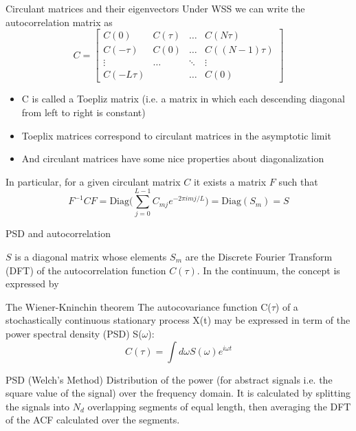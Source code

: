 \documentclass[
10pt,
aspectratio=169,
]{beamer}
\begin{document}
\begin{frame}{Circulant matrices and their eigenvectors}
Under WSS we can write the autocorrelation matrix as
    \[C=
\begin{bmatrix}
    C(0) & C(\tau) & \dots  & C(N\tau) \\
    C(-\tau) & C(0) & \dots  & C((N-1)\tau)\\
    \vdots & \dots & \ddots & \vdots \\
    C(-L\tau) & & \dots & C(0)
\end{bmatrix}
\]
\begin{itemize}
    \item C is called a Toepliz matrix (i.e. a matrix in which each descending diagonal from left to right is constant)
    \item Toeplix matrices correspond to circulant matrices in the asymptotic limit
    \item And circulant matrices have some nice properties about diagonalization
\end{itemize}
In particular, for a given circulant matrix $C$ it exists a matrix $F$ such that
\[
F^{-1}CF = \text{Diag}\biggl(\sum_{j=0}^{L-1}C_{mj}e^{-2\pi imj/L}\biggr) = \text{Diag}(S_m) = S
\]
\end{frame}
\begin{frame}{PSD and autocorrelation}

$S$ is a diagonal matrix whose elements $S_m$ are the Discrete Fourier Transform (DFT) of the autocorrelation function $C(\tau)$. 
In the continuum, the concept is expressed by 
\begin{block}{The Wiener-Kninchin theorem}
    The autocovariance function C($\tau$) of a stochastically continuous stationary process X(t) may be expressed in term of the power spectral density (PSD) S($\omega$):
    \begin{equation}
        C(\tau) = \int d\omega S(\omega) e^{i\omega t}
    \end{equation}
    
\end{block}
    \begin{block}{PSD (Welch's Method)}
        Distribution of the power (for abstract signals i.e. the square value of the signal) over the frequency domain. It is calculated by splitting the signals into $N_d$ overlapping segments of equal length, then averaging the DFT of the ACF calculated over the segments.
    \end{block}
\end{frame}
\end{document}
